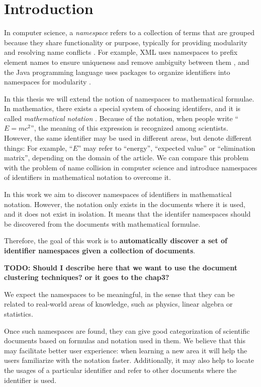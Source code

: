 \section{Introduction}

In computer science, a \emph{namespace} refers to a collection of terms
that are grouped because they share functionality or purpose,
typically for providing modularity and resolving name conflicts \cite{duval2002metadata}.
For example, XML uses namespaces to prefix element names to ensure uniqueness and remove ambiguity between them \cite{xmlnamespaces}, and the Java programming language uses packages to organize identifiers into namespaces for modularity \cite{gosling2014java}.

In this thesis we will extend the notion of namespaces to mathematical formulae. 
In mathematics, there exists a special system of choosing identifers, and it is called 
\emph{mathematical notation} \cite{wikinotation}. Because of the notation, 
when people write ``$E=mc^2$'', the meaning of this expression is recognized among scientists. 
However, the same identifier may be used in different areas, but denote 
different things: For example, ``$E$'' may refer to ``energy'', ``expected value'' or 
``elimination matrix'', depending on the domain of the article.
We can compare this problem with the problem of name collision in computer science 
and introduce namespaces of identifiers in mathematical notation to overcome it. 

In this work we aim to discover namespaces of identifiers in mathematical notation. 
However, the notation only exists in the documents where it is used, and it does 
not exist in isolation. 
It means that the identifer namespaces should be discovered from the documents 
with mathematical formulae. 

Therefore, the goal of this work is to \textbf{automatically discover a set of identifier
namespaces given a collection of documents}.

\textbf{TODO: Should I describe here that we want to use the document clustering
techniques? or it goes to the chap3?}

We expect the namespaces to be meaningful, in the sense that they can be related to real-world areas of knowledge, such as physics, linear algebra or statistics.

Once such namespaces are found, they can give good categorization of scientific 
documents based on formulas and notation used in them. We believe that this may 
facilitate better user experience: when learning a new area it will help the users 
familiarize with the notation faster.
Additionally, it may also help to locate the usages of a particular identifier and 
refer to other documents where the identifier is used. 

